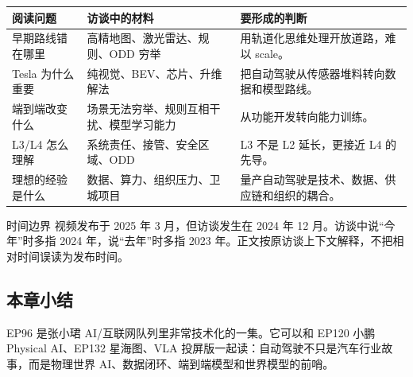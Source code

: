 \noindent\begin{tabularx}{\textwidth}{p{}p{}X}
\toprule
阅读问题 & 访谈中的材料 & 要形成的判断 \\
\midrule
早期路线错在哪里 & 高精地图、激光雷达、规则、ODD 穷举 & 用轨道化思维处理开放道路，难以 scale。 \\
Tesla 为什么重要 & 纯视觉、BEV、芯片、升维解法 & 把自动驾驶从传感器堆料转向数据和模型路线。 \\
端到端改变什么 & 场景无法穷举、规则互相干扰、模型学习能力 & 从功能开发转向能力训练。 \\
L3/L4 怎么理解 & 系统责任、接管、安全区域、ODD & L3 不是 L2 延长，更接近 L4 的先导。 \\
理想的经验是什么 & 数据、算力、组织压力、卫城项目 & 量产自动驾驶是技术、数据、供应链和组织的耦合。 \\
\bottomrule
\end{tabularx}

\begin{warningbox}{时间边界}
视频发布于 2025 年 3 月，但访谈发生在 2024 年 12 月。访谈中说“今年”时多指 2024 年，说“去年”时多指 2023 年。正文按原访谈上下文解释，不把相对时间误读为发布时间。
\end{warningbox}

\subsection{本章小结}

EP96 是张小珺 AI/互联网队列里非常技术化的一集。它可以和 EP120 小鹏 Physical AI、EP132 星海图、VLA 投屏版一起读：自动驾驶不只是汽车行业故事，而是物理世界 AI、数据闭环、端到端模型和世界模型的前哨。

